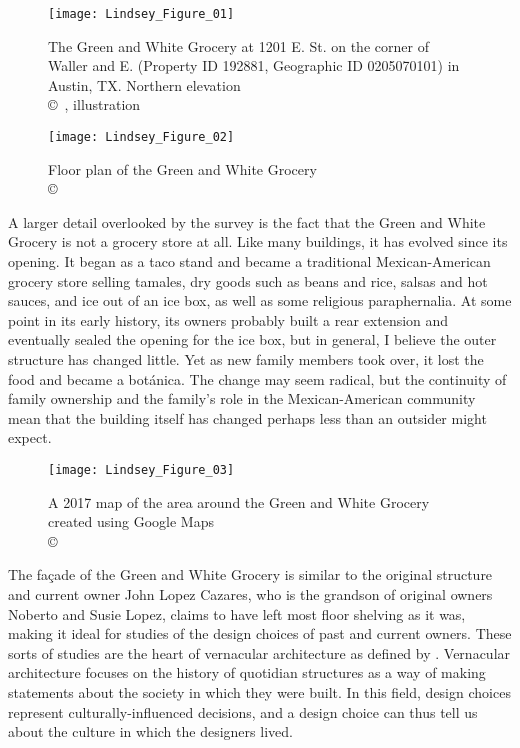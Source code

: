 \begin{figure}[!p]
\begin{minipage}[t]{.49\linewidth}
	\texttt{[image: Lindsey\_Figure\_01]}
	\caption{The Green and White Grocery at 1201 E.  St. on the corner of Waller and E.  
(Property ID 192881, Geographic ID 0205070101) 
in Austin, TX. Northern elevation\\
		{\normalfont\scriptsize \copyright\
			\shortauthor, illustration
	}}
	\label{fig:Lindsey_Figure_01}
\end{minipage}
\hfill
\begin{minipage}[t]{.49\linewidth}
	\texttt{[image: Lindsey\_Figure\_02]}
	\caption{Floor plan of the Green and White Grocery\\
		{\normalfont\scriptsize \copyright\
			\shortauthor
	}}
	\label{fig:Lindsey_Figure_02}
\end{minipage}
\end{figure}

A larger detail overlooked by the survey is the fact that the Green and White Grocery is not a grocery store at all. Like many buildings, it has evolved since its opening. It began as a taco stand and became a traditional Mexican-American grocery store selling tamales, dry goods such as beans and rice, salsas and hot sauces, and ice out of an ice box, as well as some religious paraphernalia. At some point in its early history, its owners probably built a rear extension and eventually sealed the opening for the ice box, but in general, I believe the outer structure has changed little. Yet as new family members took over, it lost the food and became a botánica. The change may seem radical, but the continuity of family ownership and the family’s role in the Mexican-American community mean that the building itself has changed perhaps less than an outsider might expect.

\begin{figure}[!p]
	\texttt{[image: Lindsey\_Figure\_03]}
	\caption{A 2017 map of the area around the Green and White Grocery created using Google Maps \\
		{\normalfont\scriptsize \copyright\ \textcite{googlemaps}
	}}
	\label{fig:Lindsey_Figure_03}
\end{figure}

The façade of the Green and White Grocery is similar to the original structure and current owner John Lopez Cazares, who is the grandson of original owners Noberto and Susie Lopez, claims to have left most floor shelving as it was, making it ideal for studies of the design choices of past and current owners. These sorts of studies are the heart of vernacular architecture as defined by \textcite{glassie}. Vernacular architecture focuses on the history of quotidian structures as a way of making statements about the society in which they were built. In this field, design choices represent culturally-influenced decisions, and a design choice can thus tell us about the culture in which the designers lived.

